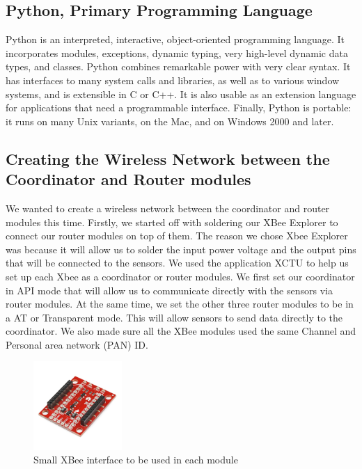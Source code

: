 \documentclass[a4paper,11pt]{report}
\begin{document}
	\subsection{Python, Primary Programming Language}
	Python is an interpreted, interactive, object-oriented programming language. It incorporates modules, exceptions, dynamic typing, very high-level dynamic data types, and classes. Python combines remarkable power with very clear syntax. It has interfaces to many system calls and libraries, as well as to various window systems, and is extensible in C or C++. It is also usable as an extension language for applications that need a programmable interface. Finally, Python is portable: it runs on many Unix variants, on the Mac, and on Windows 2000 and later.
	\subsection{Creating the Wireless Network between the Coordinator and Router modules}
	\par We wanted to create a wireless network between the coordinator and router modules this time. Firstly, we started off with soldering our XBee Explorer to connect our router modules on top of them. The reason we chose Xbee Explorer was because it will allow us to solder the input power voltage and the output pins that will be connected to the sensors. We used the application XCTU to help us set up each Xbee as a coordinator or router modules. We first set our coordinator in API mode that will allow us to communicate directly with the sensors via router modules. At the same time, we set the other three router modules to be in a AT or Transparent mode. This will allow sensors to send data directly to the coordinator. We also made sure all the XBee modules used the same Channel and Personal area network (PAN) ID. 
	\begin{figure}[h]
		\centering
		\includegraphics[width = 0.3\textwidth]{xbeeMiniExplorer.png}
		\caption{Small XBee interface to be used in each module}
	\end{figure}
	\newpage
\end{document}
